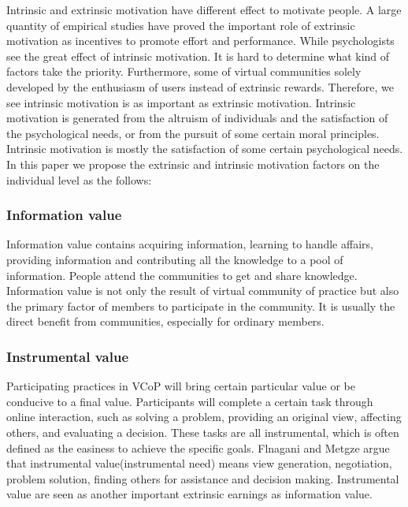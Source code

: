 \documentclass{elsarticle}
\begin{document}
Intrinsic and extrinsic motivation have different effect to motivate people\cite{deci1985ima}. A large quantity of empirical studies have proved the important role
of extrinsic motivation as incentives to promote effort and
performance\cite{gibbons1998io}\cite{388530120001201}. While
psychologists see the great effect of intrinsic
motivation\cite{bul-125-6-62719991101}\cite{wilson1981aas}. It is hard
to determine what kind of  factors
take the priority. Furthermore, some of virtual communities solely 
developed by the enthusiasm of users instead of extrinsic
rewards. Therefore, we see intrinsic motivation is as important as extrinsic
motivation. Intrinsic motivation is generated from the altruism of
individuals and the satisfaction of the psychological needs, or from
the pursuit of some certain moral principles. Intrinsic motivation is
mostly the satisfaction of some certain psychological
needs\cite{josh_lerner_simple_2002}. In this paper we propose 
the extrinsic and intrinsic 
motivation factors on the individual level  as the
follows: 


\subsubsection{ Information value}

Information value contains acquiring
  information, learning to handle affairs, providing information and
  contributing all the knowledge to a pool of
  information\cite{flanagin2001internet}. People attend the
  communities to get and share knowledge\cite{dholakia2004241}. Information value is not only the result of
  virtual community of practice but also the primary factor of members
  to participate in the community. It is usually the direct benefit
  from communities, especially for ordinary members.   

  \subsubsection{Instrumental value}
\label{sec:instrumental-value}
  
Participating practices in VCoP will bring certain particular value or
be conducive to a final value\cite{Roennow-Rasmussen2002}. 
Participants will complete a certain task through
online interaction, such as solving a problem, providing an original
view, affecting others, and evaluating a decision. These tasks are all
instrumental, which is often defined as the easiness to achieve the
specific goals. Flnagani and Metgze argue that instrumental
value(instrumental need) means view generation, negotiation, problem
solution, finding others for assistance and decision
making\cite{flanagin2001internet}. Instrumental value are seen as
another important extrinsic earnings as information value\cite{dholakia2004241}.
\end{document}

